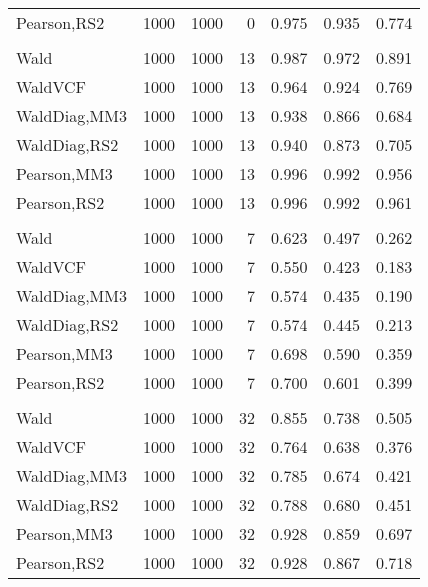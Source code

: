 \documentclass[
]{article}
\begin{document}
\begin{table}[H]
{\begin{tabular}[t]{lrrrrrr}
\hspace{1em}Pearson,RS2 & 1000 & 1000 & 0 & 0.975 & 0.935 & 0.774\\
\addlinespace[0.3em]
\multicolumn{7}{l}{\textbf{1F 15V}}\\
\hspace{1em}Wald & 1000 & 1000 & 13 & 0.987 & 0.972 & 0.891\\
\hspace{1em}WaldVCF & 1000 & 1000 & 13 & 0.964 & 0.924 & 0.769\\
\hspace{1em}WaldDiag,MM3 & 1000 & 1000 & 13 & 0.938 & 0.866 & 0.684\\
\hspace{1em}WaldDiag,RS2 & 1000 & 1000 & 13 & 0.940 & 0.873 & 0.705\\
\hspace{1em}Pearson,MM3 & 1000 & 1000 & 13 & 0.996 & 0.992 & 0.956\\
\hspace{1em}Pearson,RS2 & 1000 & 1000 & 13 & 0.996 & 0.992 & 0.961\\
\addlinespace[0.3em]
\multicolumn{7}{l}{\textbf{2F 10V}}\\
\hspace{1em}Wald & 1000 & 1000 & 7 & 0.623 & 0.497 & 0.262\\
\hspace{1em}WaldVCF & 1000 & 1000 & 7 & 0.550 & 0.423 & 0.183\\
\hspace{1em}WaldDiag,MM3 & 1000 & 1000 & 7 & 0.574 & 0.435 & 0.190\\
\hspace{1em}WaldDiag,RS2 & 1000 & 1000 & 7 & 0.574 & 0.445 & 0.213\\
\hspace{1em}Pearson,MM3 & 1000 & 1000 & 7 & 0.698 & 0.590 & 0.359\\
\hspace{1em}Pearson,RS2 & 1000 & 1000 & 7 & 0.700 & 0.601 & 0.399\\
\addlinespace[0.3em]
\multicolumn{7}{l}{\textbf{3F 15V}}\\
\hspace{1em}Wald & 1000 & 1000 & 32 & 0.855 & 0.738 & 0.505\\
\hspace{1em}WaldVCF & 1000 & 1000 & 32 & 0.764 & 0.638 & 0.376\\
\hspace{1em}WaldDiag,MM3 & 1000 & 1000 & 32 & 0.785 & 0.674 & 0.421\\
\hspace{1em}WaldDiag,RS2 & 1000 & 1000 & 32 & 0.788 & 0.680 & 0.451\\
\hspace{1em}Pearson,MM3 & 1000 & 1000 & 32 & 0.928 & 0.859 & 0.697\\
\hspace{1em}Pearson,RS2 & 1000 & 1000 & 32 & 0.928 & 0.867 & 0.718\\
\bottomrule
\end{tabular}}
\endgroup{}
\end{table}
\end{document}
